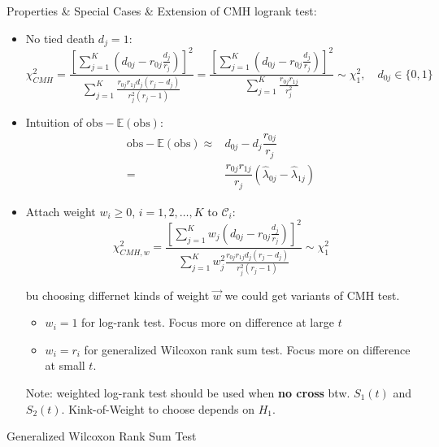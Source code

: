 Properties \& Special Cases \& Extension of CMH logrank test:
\begin{itemize}[topsep=2pt,itemsep=0pt]
    \item No tied death $ d_j=1 $:
    \begin{equation}\label{EqaCMHTest}
        \chi^2 _{CMH}=\dfrac{\left[ \sum_{j=1}^K (d_{0j}-r_{0j}\frac{d_j}{r_j}) \right]^2 }{\sum_{j=1}^K \frac{r_{0j}r_{1j}d_j(r_j-d_j)}{r_j^2(r_j-1)}}= \dfrac{\left[ \sum_{j=1}^K (d_{0j}-r_{0j}\frac{d_j}{r_j}) \right]^2 }{\sum_{j=1}^K \frac{r_{0j}r_{1j}}{r_j^2}} \sim \chi^2_1,\quad d_{0j}\in\{0,1\}
    \end{equation}
    \item Intuition of $ \mathrm{obs}-\mathbb{E}\left( \mathrm{obs}  \right)   $:
    \begin{align}
        \mathrm{obs}-\mathbb{E}\left( \mathrm{obs}  \right) \approx& d_{0j}-d_j\dfrac{r_{0j}}{r_{j}}\\
        =&\dfrac{r_{0j}r_{1j}}{r_j}\left(\hat{\lambda }_{0j}-\hat{\lambda }_{1j}\right)
    \end{align}
    \item Attach weight $ w_i\geq 0 $, $ i=1,2,\ldots ,K $ to $ \mathcal{C}_i $:
    \begin{equation}
        \chi^2_{CMH,w}=\dfrac{\left[ \sum_{j=1}^K w_j(d_{0j}-r_{0j}\frac{d_j}{r_j}) \right]^2 }{\sum_{j=1}^K w_j^2\frac{r_{0j}r_{1j}d_j(r_j-d_j)}{r_j^2(r_j-1)}}\sim \chi^2_1
    \end{equation}
    
    bu choosing differnet kinds of weight $ \vec{w} $ we could get variants of CMH test.
    \begin{itemize}[topsep=2pt,itemsep=0pt]
        \item $ w_i=1 $ for log-rank test. Focus more on difference at large $ t $
        \item $ w_i=r_i $ for generalized Wilcoxon rank sum test.  Focus more on difference at small $ t $.
    \end{itemize}
    
    Note: weighted log-rank test should be used when \textbf{no cross}  btw. $ S_1(t) $ and $ S_2(t) $. Kink-of-Weight to choose depends on $ H_1 $.
        
    
\end{itemize}



\begin{point}
    Generalized Wilcoxon Rank Sum Test
\end{point}


